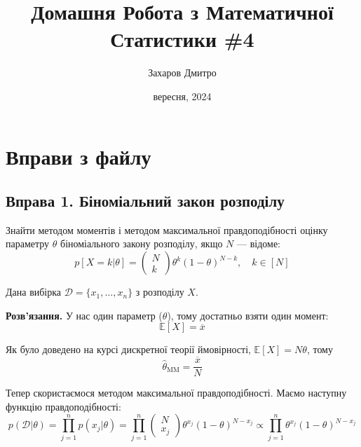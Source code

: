 \documentclass{hw_template}
\title{\huge\sffamily\bfseries Домашня Робота з Математичної Статистики \#4}
\author{\Large\sffamily Захаров Дмитро}
\date{\sffamily 29 вересня, 2024}
\begin{document}
\pagestyle{fancy}

\maketitle

\tableofcontents

\pagebreak

\section{Вправи з файлу}

\subsection{Вправа 1. Біноміальний закон розподілу}

\begin{problem}
    Знайти методом моментів і методом максимальної правдоподібності оцінку параметру $\theta$
    біноміального закону розподілу, якщо $N$ --- відоме:
    \begin{equation*}
        p[X = k|\theta] = \begin{pmatrix}
        N \\ k
        \end{pmatrix} \theta^k (1-\theta)^{N-k}, \quad k \in [N]
    \end{equation*}

    Дана вибірка $\mathcal{D} = \{x_1,\dots,x_n\}$ з розподілу $X$.
\end{problem}

\textbf{Розв'язання.} У нас один параметр ($\theta$), тому достатньо взяти один момент:
\begin{equation*}
    \mathbb{E}[X] = \overline{x}    
\end{equation*}

Як було доведено на курсі дискретної теорії ймовірності, $\mathbb{E}[X] = N\theta$, тому
\begin{equation*}
    \hat{\theta}_{\text{MM}} = \frac{\overline{x}}{N}
\end{equation*}

Тепер скористаємося методом максимальної правдоподібності. Маємо наступну функцію правдоподібності:
\begin{equation*}
    p(\mathcal{D} | \theta) = \prod_{j=1}^n p(x_j | \theta) = \prod_{j=1}^n \begin{pmatrix}
        N \\ x_j
    \end{pmatrix} \theta^{x_j}(1-\theta)^{N-x_j} \propto \prod_{j=1}^n \theta^{x_j}(1-\theta)^{N-x_j}
\end{equation*}
\end{document}
